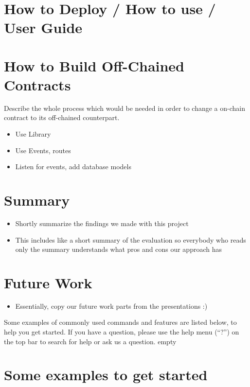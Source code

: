 \documentclass[a4paper]{article}
\begin{document}
\section{How to Deploy / How to use / User Guide}

\section{How to Build Off-Chained Contracts}

Describe the whole process which would be needed in order to change a on-chain contract to its off-chained counterpart.

\begin{itemize}
\item Use Library
\item Use Events, routes
\item Listen for events, add database models
\end{itemize}


\section{Summary}
\begin{itemize}
\item Shortly summarize the findings we made with this project
\item This includes like a short summary of the evaluation so everybody who reads only the summary understands what pros and cons our approach has
\end{itemize}


\section{Future Work}
\begin{itemize}
\item Essentially, copy our future work parts from the presentations :)
\end{itemize}


\newpage
Some examples of commonly used commands and features are listed below, to help you get started. If you have a question, please use the help menu (``?'') on the top bar to search for help or ask us a question. 
\newpage
empty
\newpage

\section{Some examples to get started}
\end{document}
